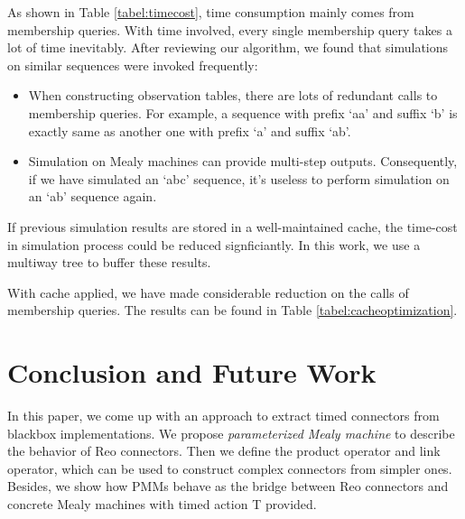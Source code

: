 \documentclass[conference, a4paper]{IEEEtran}
\begin{document}
As shown in Table \ref{tabel:timecost}, time consumption mainly comes from membership queries.
With time involved, every single membership query takes a lot of time inevitably.
After reviewing our algorithm, we found that simulations on similar sequences were invoked frequently:

\begin{itemize}
  \item When constructing observation tables, there are lots of redundant calls to membership
    queries. For example, a sequence with prefix `aa' and suffix `b' is exactly same as another one
    with prefix `a' and suffix `ab'.
  \item Simulation on Mealy machines can provide multi-step outputs.  Consequently, if we have
    simulated an `abc' sequence, it's useless to perform simulation on an `ab' sequence again.
\end{itemize}

If previous simulation results are stored in a well-maintained cache, the time-cost in
simulation process could be reduced signficiantly. In this work, we use a multiway tree to buffer
these results.


With cache applied, we have made considerable reduction on the calls of membership queries. The results
can be found in Table \ref{tabel:cacheoptimization}.

\section{Conclusion and Future Work}
In this paper, we come up with an approach to extract timed connectors from blackbox
implementations. We propose \emph{parameterized Mealy machine} to describe the behavior of Reo
connectors. Then we define the product operator and link operator, which can be used to
construct complex connectors from simpler ones.
Besides, we show how PMMs behave as the bridge between Reo connectors and concrete Mealy
machines with timed action T provided. 
\end{document}
